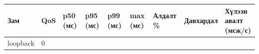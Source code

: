 \begingroup\scriptsize\begin{longtable}[]{@{}lllllllll@{}}
\toprule
\begin{minipage}[b]{0.08\columnwidth}\raggedright
Зам\strut
\end{minipage} & \begin{minipage}[b]{0.08\columnwidth}\raggedright
QoS\strut
\end{minipage} & \begin{minipage}[b]{0.08\columnwidth}\raggedright
p50 (мс)\strut
\end{minipage} & \begin{minipage}[b]{0.08\columnwidth}\raggedright
p95 (мс)\strut
\end{minipage} & \begin{minipage}[b]{0.08\columnwidth}\raggedright
\textbf{p99 (мс)}\strut
\end{minipage} & \begin{minipage}[b]{0.08\columnwidth}\raggedright
max (мс)\strut
\end{minipage} & \begin{minipage}[b]{0.08\columnwidth}\raggedright
Алдалт \%\strut
\end{minipage} & \begin{minipage}[b]{0.08\columnwidth}\raggedright
Давхардал\strut
\end{minipage} & \begin{minipage}[b]{0.08\columnwidth}\raggedright
Хүлээн авалт (мсж/с)\strut
\end{minipage}\tabularnewline
\midrule
\endhead
\begin{minipage}[t]{0.08\columnwidth}\raggedright
loopback\strut
\end{minipage} & \begin{minipage}[t]{0.08\columnwidth}\raggedright
0\strut
\end{minipage} & \begin{minipage}[t]{0.08\columnwidth}\raggedright
\strut
\end{minipage} & \begin{minipage}[t]{0.08\columnwidth}\raggedright
\strut
\end{minipage} & \begin{minipage}[t]{0.08\columnwidth}\raggedright
\strut
\end{minipage} & \begin{minipage}[t]{0.08\columnwidth}\raggedright
\strut
\end{minipage} & \begin{minipage}[t]{0.08\columnwidth}\raggedright

\end{minipage}
\end{longtable}
